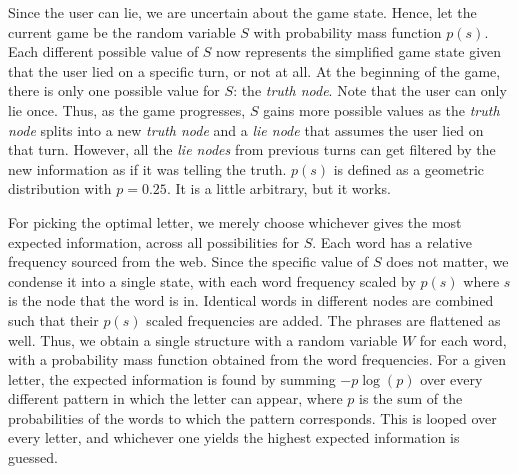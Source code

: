 \documentclass[conference,letterpaper]{IEEEtran}
\begin{document}
    Since the user can lie, we are uncertain about the game state. Hence, let the current game be the random variable $S$ with probability mass function $p(s)$. Each different possible value of $S$ now represents the simplified game state given that the user lied on a specific turn, or not at all. At the beginning of the game, there is only one possible value for $S$: the \textit{truth node}. Note that the user can only lie once. Thus, as the game progresses, $S$ gains more possible values as the \textit{truth node} splits into a new \textit{truth node} and a \textit{lie node} that assumes the user lied on that turn. However, all the \textit{lie nodes} from previous turns can get filtered by the new information as if it was telling the truth. $p(s)$ is defined as a geometric distribution with $p=0.25$. It is a little arbitrary, but it works.

    For picking the optimal letter, we merely choose whichever gives the most expected information, across all possibilities for $S$. Each word has a relative frequency sourced from the web. Since the specific value of $S$ does not matter, we condense it into a single state, with each word frequency scaled by $p(s)$ where $s$ is the node that the word is in. Identical words in different nodes are combined such that their $p(s)$ scaled frequencies are added. The phrases are flattened as well. Thus, we obtain a single structure with a random variable $W$ for each word, with a probability mass function obtained from the word frequencies. For a given letter, the expected information is found by summing $-p \log(p)$ over every different pattern in which the letter can appear, where $p$ is the sum of the probabilities of the words to which the pattern corresponds. This is looped over every letter, and whichever one yields the highest expected information is guessed.

    \autocite{wiki:Plagiarism}
    \printbibliography
\end{document}
